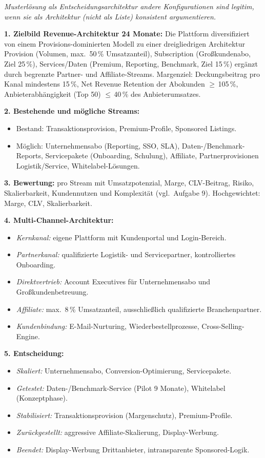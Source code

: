 \documentclass[11pt,a4paper,oneside]{article}
\begin{document}
\begin{loesungbox}
\emph{Musterlösung als Entscheidungsarchitektur \textendash{} andere Konfigurationen sind legitim, wenn sie als Architektur (nicht als Liste) konsistent argumentieren.}

\smallskip
\textbf{1. Zielbild Revenue-Architektur 24 Monate:}
Die Plattform diversifiziert von einem Provisions-dominierten Modell zu einer dreigliedrigen Architektur \textendash{} Provision (Volumen, max.\ 50\,\% Umsatzanteil), Subscription (Großkundenabo, Ziel 25\,\%), Services/Daten (Premium, Reporting, Benchmark, Ziel 15\,\%) \textendash{} ergänzt durch begrenzte Partner- und Affiliate-Streams. Margenziel: Deckungsbeitrag pro Kanal mindestens 15\,\%, Net Revenue Retention der Abokunden $\geq$\,105\,\%, Anbieterabhängigkeit (Top 50) $\leq$\,40\,\% des Anbieterumsatzes.

\smallskip
\textbf{2. Bestehende und mögliche Streams:}
\begin{itemize}
  \item Bestand: Transaktionsprovision, Premium-Profile, Sponsored Listings.
  \item Möglich: Unternehmensabo (Reporting, SSO, SLA), Daten-/Benchmark-Reports, Servicepakete (Onboarding, Schulung), Affiliate, Partnerprovisionen Logistik/Service, Whitelabel-Lösungen.
\end{itemize}

\textbf{3. Bewertung:} pro Stream mit Umsatzpotenzial, Marge, CLV-Beitrag, Risiko, Skalierbarkeit, Kundennutzen und Komplexität (vgl.\ Aufgabe 9). Hochgewichtet: Marge, CLV, Skalierbarkeit.

\smallskip
\textbf{4. Multi-Channel-Architektur:}
\begin{itemize}
  \item \emph{Kernkanal:} eigene Plattform mit Kundenportal und Login-Bereich.
  \item \emph{Partnerkanal:} qualifizierte Logistik- und Servicepartner, kontrolliertes Onboarding.
  \item \emph{Direktvertrieb:} Account Executives für Unternehmensabo und Großkundenbetreuung.
  \item \emph{Affiliate:} max.\ 8\,\% Umsatzanteil, ausschließlich qualifizierte Branchenpartner.
  \item \emph{Kundenbindung:} E-Mail-Nurturing, Wiederbestellprozesse, Cross-Selling-Engine.
\end{itemize}

\textbf{5. Entscheidung:}
\begin{itemize}
  \item \emph{Skaliert:} Unternehmensabo, Conversion-Optimierung, Servicepakete.
  \item \emph{Getestet:} Daten-/Benchmark-Service (Pilot 9 Monate), Whitelabel (Konzeptphase).
  \item \emph{Stabilisiert:} Transaktionsprovision (Margenschutz), Premium-Profile.
  \item \emph{Zurückgestellt:} aggressive Affiliate-Skalierung, Display-Werbung.
  \item \emph{Beendet:} Display-Werbung Drittanbieter, intransparente Sponsored-Logik.
\end{itemize}


\end{loesungbox}
\end{document}
